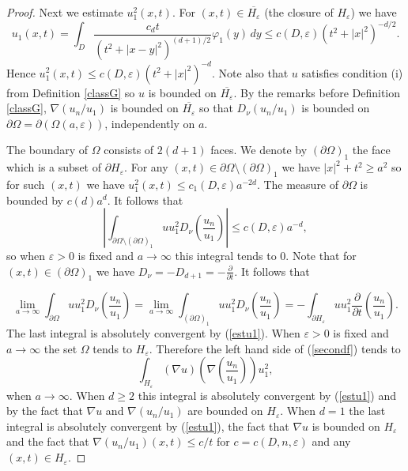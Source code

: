 \documentclass[11pt,leqno]{article}
\theoremstyle{definition}
\newcommand{\eps}{\varepsilon}
\numberwithin{equation}{section}
\begin{document}
\begin{proof}
Next we  estimate $u_1^2(x,t)$. For $(x,t) \in \overline{H_{\eps}}$ (the closure of $H_{\eps}$)
we have
\begin{equation}
\label{estu1}
u_1(x,t) = \int_D \frac{c_d t}{(t^2 + |x - y|^2)^{(d + 1)/2}} \varphi_1(y) \, dy 
\le c(D,\eps) (t^2 + |x|^2)^{-d/2}.
\end{equation}
Hence  $u_1^2(x,t) \le c(D,\eps) (t^2 + |x|^2)^{-d}$. Note also that $u$ satisfies condition (i)
from Definition \ref{classG} so $u$ is bounded on $\overline{H_{\eps}}$. By the
remarks before
Definition \ref{classG}, $\nabla(u_n/u_1)$ is bounded on $\overline{H_{\eps}}$ so
that $D_{\nu}(u_n/u_1)$ is bounded on $\partial \Omega = \partial(\Omega(a,\eps))$,
independently on $a$.

The boundary of $\Omega$  consists of $2(d + 1)$ faces. We denote by $(\partial \Omega)_1$
the face which is a subset of $\partial H_{\eps}$. For any $(x,t) \in \partial \Omega
\setminus (\partial
\Omega)_1$ we have $|x|^2 + t^2 \ge a^2$ so for such $(x,t)$ we have $u_1^2(x,t) \le
c_1(D,\eps) a^{-2 d}$. The measure of $\partial \Omega$ is bounded by $c(d) a^d$. It follows
that
$$
\left| \int_{\partial \Omega \setminus (\partial \Omega)_1} u u_1^2 D_{\nu} \left(\frac{u_n}{u_1}\right) \right| \le c(D,\eps) a^{-d},
$$ 
so when $\eps > 0$ is fixed and $a \to \infty$ this integral tends to $0$.
Note that for $(x,t) \in (\partial \Omega)_1$ we have $D_{\nu} = -
D_{d + 1} = - \frac{\partial}{\partial t}$. It follows that 

$$
\lim_{a \to \infty} \int_{\partial \Omega} u u_1^2 D_{\nu} \left(\frac{u_n}{u_1}\right) 
= \lim_{a \to \infty} \int_{(\partial \Omega)_1} u u_1^2 D_{\nu} \left(\frac{u_n}{u_1}\right)
= - \int_{\partial H_{\eps}} u u_1^2  \frac{\partial}{\partial t}\left(\frac{u_n}{u_1}\right).
$$
The last integral is absolutely convergent by (\ref{estu1}). When $\eps > 0$ is fixed and $a \to \infty$ the set $\Omega$ tends to $H_{\eps}$. Therefore the left hand side of (\ref{secondf}) tends to 
$$
\int_{H_{\eps}} (\nabla u) \left(\nabla \left(\frac{u_n}{u_1}\right)\right) u_1^2,
$$
when $a \to \infty$. When $d \ge 2$ this integral is absolutely convergent by (\ref{estu1}) and by the fact that $\nabla u$ and $\nabla (u_n/u_1)$ are bounded on $H_{\eps}$. When $d = 1$ the last integral is absolutely convergent by (\ref{estu1}), the fact that $\nabla u$ is bounded on $H_{\eps}$ and the fact that $\nabla(u_n/u_1)(x,t) \le c/t$ for $c = c(D,n,\eps)$ and any $(x,t) \in H_{\eps}$.
\end{proof}
\end{document}
